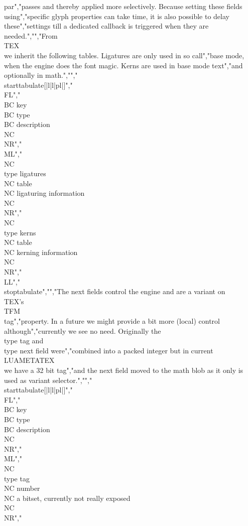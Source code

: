 par","passes and thereby applied more selectively. Because setting these fields using","specific glyph properties can take time, it is also possible to delay these","settings till a dedicated callback is triggered when they are needed.","","From \\TEX\\ we inherit the following tables. Ligatures are only used in so call","base mode, when the engine does the font magic. Kerns are used in base mode text","and optionally in math.","","\\starttabulate[|l|l|pl|]","\\FL","\\BC key               \\BC type  \\BC description            \\NC \\NR","\\ML","\\NC \\type {ligatures} \\NC table \\NC ligaturing information \\NC \\NR","\\NC \\type {kerns}     \\NC table \\NC kerning information    \\NC \\NR","\\LL","\\stoptabulate","","The next fields control the engine and are a variant on \\TEX's \\TFM\\ tag","property. In a future we might provide a bit more (local) control although","currently we see no need. Originally the \\type {tag} and \\type {next} field were","combined into a packed integer but in current \\LUAMETATEX\\ we have a 32 bit tag","and the next field moved to the math blob as it only is used as variant selector.","","\\starttabulate[|l|l|pl|]","\\FL","\\BC key              \\BC type    \\BC description                            \\NC \\NR","\\ML","\\NC \\type {tag}      \\NC number  \\NC a bitset, currently not really exposed \\NC\\NR","%